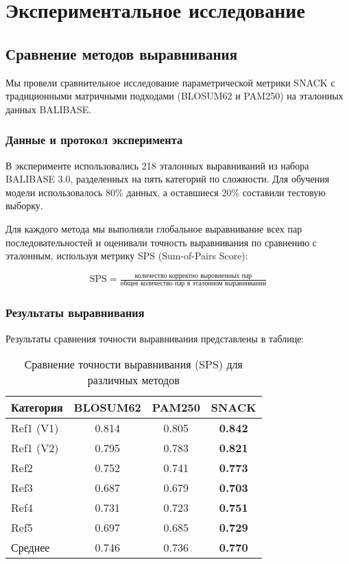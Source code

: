 \documentclass[12pt]{article}
\begin{document}
\section{Экспериментальное исследование}

\subsection{Сравнение методов выравнивания}

Мы провели сравнительное исследование параметрической метрики SNACK с традиционными матричными подходами (BLOSUM62 и PAM250) на эталонных данных BALIBASE. 

\subsubsection{Данные и протокол эксперимента}

В эксперименте использовались 218 эталонных выравниваний из набора BALIBASE 3.0, разделенных на пять категорий по сложности. Для обучения модели использовалось 80\% данных, а оставшиеся 20\% составили тестовую выборку. 

Для каждого метода мы выполняли глобальное выравнивание всех пар последовательностей и оценивали точность выравнивания по сравнению с эталонным, используя метрику SPS (Sum-of-Pairs Score):

\begin{align}
\text{SPS} = \frac{\text{количество корректно выровненных пар}}{\text{общее количество пар в эталонном выравнивании}}
\end{align}

\subsubsection{Результаты выравнивания}

Результаты сравнения точности выравнивания представлены в таблице:

\begin{table}[h]
\centering
\begin{tabular}{lccc}
\toprule
\textbf{Категория} & \textbf{BLOSUM62} & \textbf{PAM250} & \textbf{SNACK} \\
\midrule
Ref1 (V1) & 0.814 & 0.805 & \textbf{0.842} \\
Ref1 (V2) & 0.795 & 0.783 & \textbf{0.821} \\
Ref2 & 0.752 & 0.741 & \textbf{0.773} \\
Ref3 & 0.687 & 0.679 & \textbf{0.703} \\
Ref4 & 0.731 & 0.723 & \textbf{0.751} \\
Ref5 & 0.697 & 0.685 & \textbf{0.729} \\
\midrule
Среднее & 0.746 & 0.736 & \textbf{0.770} \\
\bottomrule
\end{tabular}
\caption{Сравнение точности выравнивания (SPS) для различных методов}
\label{tab:alignment_accuracy}
\end{table}
\end{document}
